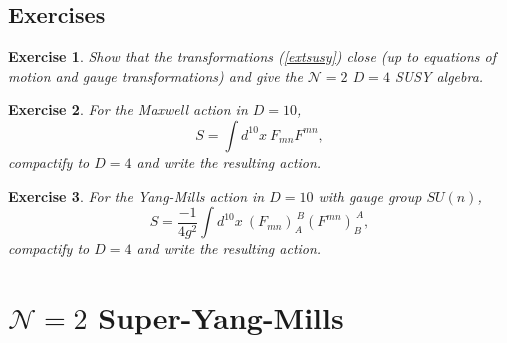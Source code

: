 \documentclass[a4paper,12pt]{article}
\newtheorem{exe}{Exercise}
\numberwithin{equation}{section}
\numberwithin{exe}{section}
\begin{document}
\subsection{Exercises}

	\begin{exe}
	Show that the transformations (\ref{extsusy}) close (up to equations of motion and gauge transformations) and give the $\mathcal N = 2$ $D=4$ SUSY algebra.
	\end{exe}

	\begin{exe}
	For the Maxwell action in $D=10$,
		\begin{equation}
		S = \int d^{10} x\ F_{mn} F^{mn},
		\end{equation}
	compactify to $D=4$ and write the resulting action.
	\end{exe}

	\begin{exe}
	For the Yang-Mills action in $D=10$ with gauge group $SU(n)$,
		\begin{equation}
		S = \frac{-1}{4g^2} \int d^{10} x\ (F_{mn})_A^{\ B} (F^{mn})_B^{\ A},
		\end{equation}
	compactify to $D=4$ and write the resulting action.
	\end{exe}

\newpage



\section{$\mathcal N=2$ Super-Yang-Mills}
\end{document}
